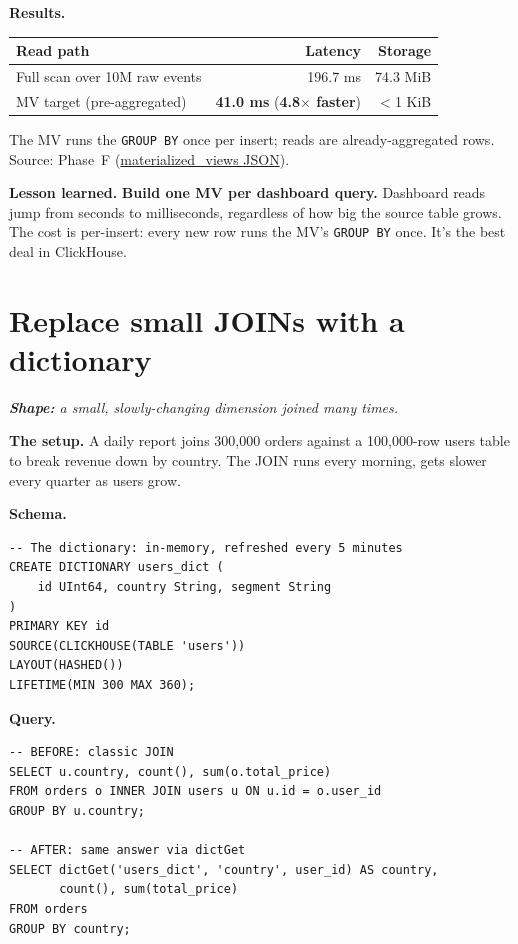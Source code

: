 \documentclass[11pt]{article}
\renewcommand{\arraystretch}{1.15}
\newcommand{\shape}[1]{%
  \par\noindent\textit{\textbf{Shape:} #1}\par\smallskip}
\newcommand{\schemaHd}{%
  \par\smallskip\noindent\textbf{\color{accentblue}Schema.}\par\nopagebreak\smallskip}
\newcommand{\queryHd}{%
  \par\smallskip\noindent\textbf{\color{accentblue}Query.}\par\nopagebreak\smallskip}
\newcommand{\resultsHd}{%
  \par\smallskip\noindent\textbf{\color{accentblue}Results.}\par\nopagebreak\smallskip}
\newcommand{\lesson}[1]{%
  \par\medskip
  \begin{lessonbox}\textbf{\color{accentgreen}Lesson learned.}\enspace #1\end{lessonbox}}
\begin{document}
\resultsHd
\renewcommand{\arraystretch}{1.20}
\begin{tabularx}{\linewidth}{@{}X r r@{}}
\toprule
\textbf{Read path}                                    & \textbf{Latency} & \textbf{Storage}\\
\midrule
Full scan over 10M raw events                         & 196.7 ms & 74.3 MiB\\
\rowcolor{accentgreen!12}MV target (pre-aggregated)   & \textbf{41.0 ms} (\textbf{4.8$\times$ faster}) & $<$1 KiB\\
\bottomrule
\end{tabularx}

\smallskip
The MV runs the \texttt{GROUP BY} once per insert; reads are
already-aggregated rows. Source: Phase~F
(\href{run:results/compare_features_20260503_194828.json}{materialized\_views JSON}).

\lesson{%
\textbf{Build one MV per dashboard query.} Dashboard reads jump from
seconds to milliseconds, regardless of how big the source table grows.
The cost is per-insert: every new row runs the MV's \texttt{GROUP BY}
once. It's the best deal in ClickHouse.}

\section{Replace small JOINs with a dictionary}

\shape{a small, slowly-changing dimension joined many times.}

\textbf{The setup.}
A daily report joins 300{,}000 orders against a 100{,}000-row users
table to break revenue down by country. The JOIN runs every morning,
gets slower every quarter as users grow.

\schemaHd
\begin{lstlisting}
-- The dictionary: in-memory, refreshed every 5 minutes
CREATE DICTIONARY users_dict (
    id UInt64, country String, segment String
)
PRIMARY KEY id
SOURCE(CLICKHOUSE(TABLE 'users'))
LAYOUT(HASHED())
LIFETIME(MIN 300 MAX 360);
\end{lstlisting}

\queryHd
\begin{lstlisting}
-- BEFORE: classic JOIN
SELECT u.country, count(), sum(o.total_price)
FROM orders o INNER JOIN users u ON u.id = o.user_id
GROUP BY u.country;

-- AFTER: same answer via dictGet
SELECT dictGet('users_dict', 'country', user_id) AS country,
       count(), sum(total_price)
FROM orders
GROUP BY country;
\end{lstlisting}
\end{document}
